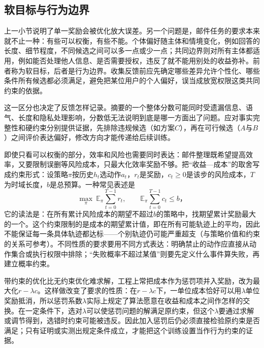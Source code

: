 \subsection{软目标与行为边界}
\label{sec:alignment-soft-hard}

上一小节说明了单一奖励会被优化放大误差。另一个问题是，邮件任务的要求本来就不止一种：有些可以权衡，有些不能。个体偏好随主体和情境变化，例如回答的长度、细节程度，不同候选之间可以多一点或少一点；共同边界则对所有主体都适用，例如能否处理他人信息、是否需要授权，违反了就不能用别处的收益弥补。前者称为软目标，后者是行为边界。收集反馈前应先确定哪些差异允许个性化、哪些条件所有候选都必须满足，避免把某位用户的个人偏好，误当成放宽权限这类共同约束的依据。

这一区分也决定了反馈怎样记录。摘要的一个整体分数可能同时受遗漏信息、语气、长度和隐私处理影响，分数低无法说明到底是哪一方面出了问题。应对事实完整性和硬约束分别提供证据，先排除违规候选（如方案$C$），再在可行候选（$A$与$B$）之间评价表达偏好，修改方向才能传递给后续训练。

即使只看可以权衡的部分，效率和风险也需要同时表达：邮件整理既希望提高效率，又要限制误删等风险成本，只最大化效率奖励不够。把“收益—成本”的取舍写成约束形式：设策略$\pi$按历史$h_t$选动作$a_t$，$r_t$是奖励，$c_t\geq0$是该步的风险成本，$T$为时域长度，$b$是总预算。一种常见表述是
\begin{equation}
 \max_\pi\ \mathbb E_\pi\sum_{t=0}^{T-1}r_t,
 \qquad
 \mathbb E_\pi\sum_{t=0}^{T-1}c_t\leq b\text{，}
 \label{eq:alignment-constrained-policy}
\end{equation}
它的读法是：在所有累计风险成本的期望不超过$b$的策略中，找期望累计奖励最大的一个。这个约束限制的是成本的期望累计值，即在所有可能轨迹上的平均，因此不能保证每一条具体轨迹都达标——个别轨迹仍可能严重超支（与策略价值和约束的关系可参考）。不同性质的要求要用不同方式表达：明确禁止的动作应直接从动作集合或执行权限中排除；“失败概率不超过某值”则要先定义什么事件算失败，再建立概率约束。

带约束的优化比无约束优化难求解，工程上常把成本作为惩罚项并入奖励，改为最大化$r-\lambda c$。这样做改变了要求的性质：在$r-\lambda c$下，一单位成本恰好可以用$\lambda$单位奖励抵消，所以惩罚系数$\lambda$实际上规定了算法愿意在收益和成本之间作怎样的交换。在一定条件下，选对$\lambda$可以使惩罚问题的解满足原约束，但这个$\lambda$要通过求解或调节得到，选错时约束可能被违反。因此加入惩罚后仍必须直接检验原约束是否满足；只有证明或实测出规定条件成立，才能把这个训练设置当作行为约束的证据。

